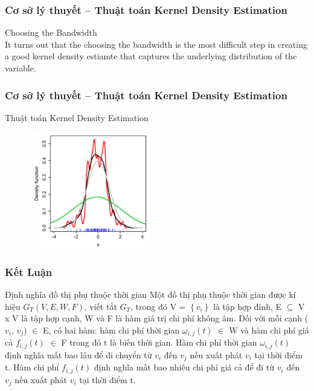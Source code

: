 \documentclass[t]{beamer}
\begin{document}
\begin{frame}
\frametitle{Cơ sở lý thuyết -- Thuật toán Kernel Density Estimation}
Choosing the Bandwidth\\
It turns out that the choosing the bandwidth is the most difficult step in creating a good kernel density estiamte that captures the underlying distribution of the variable.\\
\end{frame}


\begin{frame}
\frametitle{Cơ sở lý thuyết -- Thuật toán Kernel Density Estimation}
Thuật toán Kernel Density Estimation
\begin{center}
\includegraphics[height=2in,width=3in]{220px-Comparison_of_1D_bandwidth_selectors.png}
\end{center}
\end{frame}

\begin{frame}
\frametitle{Kết Luận}
\begin{block}{Định nghĩa đồ thị phụ thuộc thời gian}
Một đồ thị phụ thuộc thời gian được kí hiệu $G_{T}(V,E,W,F)$, viết tắt $G_{T}$, trong đó V = $\left \{ v_{i} \right \}$ là tập hợp đỉnh, E $\subseteq$ V x V là tập hợp cạnh, W và F là hàm giá trị chi phí không âm. Đối với mỗi cạnh ($v_{i}$, $v_{j}$) $\in$ E, có hai hàm: hàm chi phí thời gian $\omega_{i,j}(t)$ $\in$ W và hàm chi phí giá cả $f_{i,j}(t)$ $\in$ F trong đó t là biến thời gian. Hàm chi phí thời gian $\omega_{i,j}(t)$ định nghĩa mất bao lâu để di chuyển từ $v_{i}$ đến $v_{j}$ nếu xuất phát $v_{i}$ tại thời điểm t. Hàm chi phí $f_{i,j}(t)$ định nghĩa mất bao nhiêu chi phí giá cả để đi từ $v_{i}$ đến $v_{j}$ nếu xuất phát $v_{i}$ tại thời điểm t.
\end{block}
\end{frame}

\end{document}
